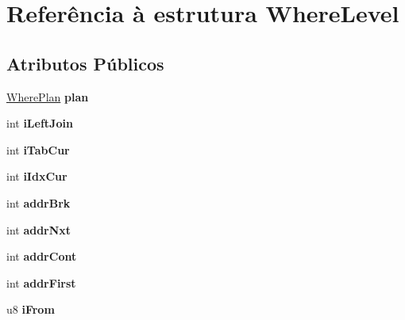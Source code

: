 \hypertarget{struct_where_level}{\section{Referência à estrutura Where\-Level}
\label{struct_where_level}
}
\subsection*{Atributos Públicos}
\begin{DoxyCompactItemize}
\item 
\hypertarget{struct_where_level_a4567b2ab4792fea7a1bc4e9baa494394}{\hyperlink{struct_where_plan}{Where\-Plan} {\bfseries plan}}\label{struct_where_level_a4567b2ab4792fea7a1bc4e9baa494394}

\item 
\hypertarget{struct_where_level_a600072864f71c568cabcbb6140f6955a}{int {\bfseries i\-Left\-Join}}\label{struct_where_level_a600072864f71c568cabcbb6140f6955a}

\item 
\hypertarget{struct_where_level_aa31c27c3304de936a6ce974450c55592}{int {\bfseries i\-Tab\-Cur}}\label{struct_where_level_aa31c27c3304de936a6ce974450c55592}

\item 
\hypertarget{struct_where_level_a0733f34c7987c721351ab0001d4b1dd9}{int {\bfseries i\-Idx\-Cur}}\label{struct_where_level_a0733f34c7987c721351ab0001d4b1dd9}

\item 
\hypertarget{struct_where_level_a06f788bd4109f394d162250af9582e45}{int {\bfseries addr\-Brk}}\label{struct_where_level_a06f788bd4109f394d162250af9582e45}

\item 
\hypertarget{struct_where_level_ab4b748f1fa2ec727f00ca42d9df60144}{int {\bfseries addr\-Nxt}}\label{struct_where_level_ab4b748f1fa2ec727f00ca42d9df60144}

\item 
\hypertarget{struct_where_level_a493d44d8f3b53d4d47191d751f8a9a94}{int {\bfseries addr\-Cont}}\label{struct_where_level_a493d44d8f3b53d4d47191d751f8a9a94}

\item 
\hypertarget{struct_where_level_a2d87c8fb787ca4111d7ab38a838325a8}{int {\bfseries addr\-First}}\label{struct_where_level_a2d87c8fb787ca4111d7ab38a838325a8}

\item 
\hypertarget{struct_where_level_a4d8e905640b12a5075ff5e2f395876dd}{u8 {\bfseries i\-From}}\label{struct_where_level_a4d8e905640b12a5075ff5e2f395876dd}


\end{DoxyCompactItemize}
